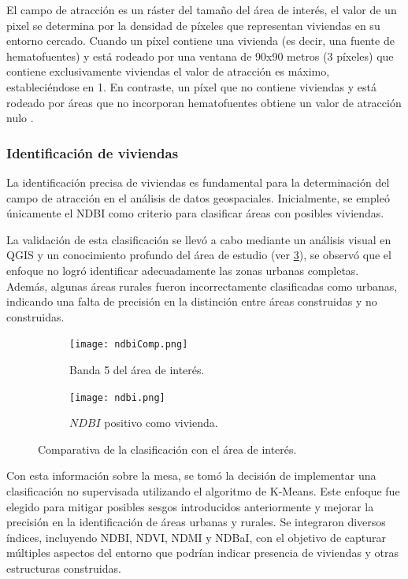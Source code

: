 El campo de atracción es un ráster del tamaño del área de interés, el valor de un pixel se determina por la densidad de píxeles que representan viviendas en su entorno cercado. Cuando un píxel contiene una vivienda (es decir, una fuente de hematofuentes) y está rodeado por una ventana de 90x90 metros (3 píxeles) que contiene exclusivamente viviendas el valor de atracción es máximo, estableciéndose en 1. En contraste, un píxel que no contiene viviendas y está rodeado por áreas que no incorporan hematofuentes obtiene un valor de atracción nulo \parencite{rotela_desarrollo_2012}. 

\subsubsection{Identificación de viviendas}

La identificación precisa de viviendas es fundamental para la determinación del campo de atracción en el análisis de datos geospaciales. Inicialmente, se empleó únicamente el NDBI como criterio para clasificar áreas con posibles viviendas. 

La validación de esta clasificación se llevó a cabo mediante un análisis visual en QGIS y un conocimiento profundo del área de estudio (ver \figurename \ref{fig:comparativa-ndbi}), se observó que el enfoque no logró identificar adecuadamente las zonas urbanas completas. Además, algunas áreas rurales fueron incorrectamente clasificadas como urbanas, indicando una falta de precisión en la distinción entre áreas construidas y no construidas.

\begin{figure}[!tbp]
	\begin{subfigure}[b]{0.49\textwidth}
		\texttt{[image: ndbiComp.png]}
		\caption{Banda 5 del área de interés.}
		\label{fig:f1}
	\end{subfigure}
	\hfill
	\begin{subfigure}[b]{0.49\textwidth}
		\texttt{[image: ndbi.png]}
		\caption{$NDBI$ positivo como vivienda.}
		\label{fig:f2}
	\end{subfigure}
	\caption{Comparativa de la clasificación con el área de interés.}
	\label{fig:comparativa-ndbi}
\end{figure}

Con esta información sobre la mesa, se tomó la decisión de implementar una clasificación no supervisada utilizando el algoritmo de K-Means. Este enfoque fue elegido para mitigar posibles sesgos introducidos anteriormente y mejorar la precisión en la identificación de áreas urbanas y rurales. Se integraron diversos índices, incluyendo NDBI, NDVI, NDMI y NDBaI, con el objetivo de capturar múltiples aspectos del entorno que podrían indicar presencia de viviendas y otras estructuras construidas.

